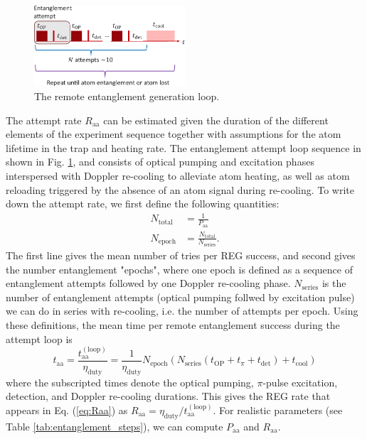 \begin{figure}[!ht]
    \centering
    \includegraphics[width=0.5\textwidth]{Images/entanglement_attempt_loop.pdf}
    \caption{The remote entanglement generation loop.}
    \label{fig:REG_loop}
\end{figure}

The attempt rate $R_{\text{aa}}$ can be estimated given the duration of the different elements of the experiment sequence together with assumptions for the atom lifetime in the trap and heating rate. The entanglement attempt loop sequence in shown in Fig. \ref{fig:REG_loop}, and consists of optical pumping and excitation phases interspersed with Doppler re-cooling to alleviate atom heating, as well as atom reloading triggered by the absence of an atom signal during re-cooling. To write down the attempt rate, we first define the following quantities:
\begin{align}
    N_{\text{total}} &= \frac{1}{P_{\text{aa}}} \\
    N_{\text{epoch}} &= \frac{N_{\text{total}}}{N_{\text{series}}}.
\end{align}
The first line gives the mean number of tries per REG success, and second gives the number entanglement "epochs", where one epoch is defined as a sequence of entanglement attempts followed by one Doppler re-cooling phase. $N_{\text{series}}$ is the number of entanglement attempts (optical pumping follwed by excitation pulse) we can do in series with re-cooling, i.e. the number of attempts per epoch. Using these definitions, the mean time per remote entanglement success during the attempt loop is 
\begin{equation}
    t_{\text{aa}}=\frac{t_{\text{aa}}^{(\text{loop})}}{\eta_{\text{duty}}}=\frac{1}{\eta_{\text{duty}}}N_{\text{epoch}}\left(N_{\text{series}}\left(t_{\text{OP}} + t_{\pi} + t_{\text{det}}\right) + t_{\text{cool}}\right)
\end{equation}
where the subscripted times denote the optical pumping, $\pi$-pulse excitation, detection, and Doppler re-cooling durations. This gives the REG rate that appears in Eq. (\ref{eq:Raa}) as $R_{\text{aa}} = \eta_{\text{duty}}/t_{\text{aa}}^{(\text{loop})}$. For realistic parameters (see Table \ref{tab:entanglement_steps}), we can compute $P_{\text{aa}}$ and $R_{\text{aa}}$.

